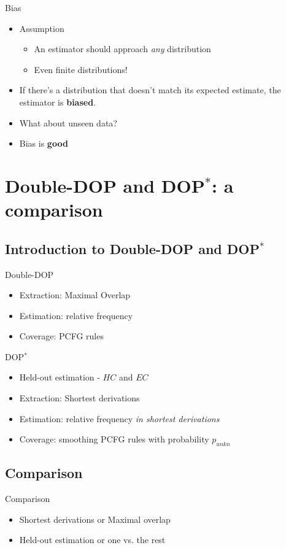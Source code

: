 \documentclass{beamer}
\newcommand{\dops}[0]{DOP$ ^*$}
\newcommand{\ddop}[0]{Double-DOP}
\begin{document}
\begin{frame}{Bias}

\begin{itemize}
\item Assumption
  \begin{itemize}
  \item An estimator should approach \emph{any} distribution
  \item Even finite distributions!
  \end{itemize}
\item If there's a distribution that doesn't match its expected estimate, the estimator is {\bf biased}.
\item What about unseen data?
\item Bias is {\bf good}
\end{itemize}
\end{frame}

\section{\ddop{} and \dops{}: a comparison}

\subsection{Introduction to \ddop{} and \dops{}}
\begin{frame}{\ddop{}}
\begin{itemize}
\item Extraction: Maximal Overlap
\item Estimation: relative frequency 
\item Coverage: PCFG rules
\end{itemize}
\end{frame}

\begin{frame}{\dops{}}
\begin{itemize}
\item Held-out estimation - $HC$ and $EC$
\item Extraction: Shortest derivations
\item Estimation: relative frequency \emph{in shortest derivations}
\item Coverage: smoothing PCFG rules with probability $p_{unkn}$
\end{itemize}
\end{frame}

\subsection{Comparison}
\begin{frame}{Comparison}
\begin{itemize}
\item Shortest derivations or Maximal overlap
\item Held-out estimation or one vs. the rest
\end{itemize}
\end{frame}
\end{document}
